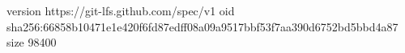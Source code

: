 version https://git-lfs.github.com/spec/v1
oid sha256:66858b10471e1e420f6fd87edff08a09a9517bbf53f7aa390d6752bd5bbd4a87
size 98400
